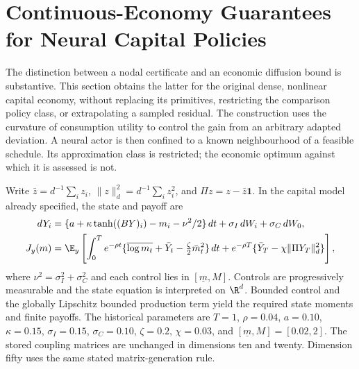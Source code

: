 \section{Continuous-Economy Guarantees for Neural Capital Policies}\label{sec:r10continuous}
The distinction between a nodal certificate and an economic diffusion bound is substantive. This section obtains the latter for the original dense, nonlinear capital economy, without replacing its primitives, restricting the comparison policy class, or extrapolating a sampled residual. The construction uses the curvature of consumption utility to control the gain from an arbitrary adapted deviation. A neural actor is then confined to a known neighbourhood of a feasible schedule. Its approximation class is restricted; the economic optimum against which it is assessed is not.

Write $\bar z=d^{-1}\sum_i z_i$, $\|z\|_d^2=d^{-1}\sum_i z_i^2$, and $\Pi z=z-\bar z\bm1$. In the capital model already specified, the state and payoff are
\begin{align}
 dY_i&=\{a+\kappa\tanh((BY)_i)-m_i-\nu^2/2\}\,dt
       +\sigma_I\,dW_i+\sigma_C\,dW_0,\label{eq:r10state}\\
 J_y(m)&=\E_y\left[\int_0^T e^{-\rho t}
  \{\overline{\log m_t}+\bar Y_t-\tfrac\zeta2\bar m_t^2\}\,dt
  +e^{-\rho T}\{\bar Y_T-\chi\|\Pi Y_T\|_d^2\}\right],\label{eq:r10payoff}
\end{align}
where $\nu^2=\sigma_I^2+\sigma_C^2$ and each control lies in $[\underline m,M]$. Controls are progressively measurable and the state equation is interpreted on $\R^d$. Bounded control and the globally Lipschitz bounded production term yield the required state moments and finite payoffs. The historical parameters are $T=1$, $\rho=0.04$, $a=0.10$, $\kappa=0.15$, $\sigma_I=0.15$, $\sigma_C=0.10$, $\zeta=0.2$, $\chi=0.03$, and $[\underline m,M]=[0.02,2]$. The stored coupling matrices are unchanged in dimensions ten and twenty. Dimension fifty uses the same stated matrix-generation rule.

